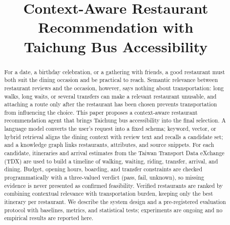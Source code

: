 \documentclass[conference]{IEEEtran}
\begin{document}
\title{Context-Aware Restaurant Recommendation with\\Taichung Bus Accessibility}

\author{
}

\maketitle

\begin{abstract}
For a date, a birthday celebration, or a gathering with friends, a good restaurant must both suit the dining occasion and be practical to reach. Semantic relevance between restaurant reviews and the occasion, however, says nothing about transportation: long walks, long waits, or several transfers can make a relevant restaurant unusable, and attaching a route only after the restaurant has been chosen prevents transportation from influencing the choice. This paper proposes a context-aware restaurant recommendation agent that brings Taichung bus accessibility into the final selection. A language model converts the user's request into a fixed schema; keyword, vector, or hybrid retrieval aligns the dining context with review text and recalls a candidate set; and a knowledge graph links restaurants, attributes, and source snippets. For each candidate, itineraries and arrival estimates from the Taiwan Transport Data eXchange (TDX) are used to build a timeline of walking, waiting, riding, transfer, arrival, and dining. Budget, opening hours, boarding, and transfer constraints are checked programmatically with a three-valued verdict (pass, fail, unknown), so missing evidence is never presented as confirmed feasibility. Verified restaurants are ranked by combining contextual relevance with transportation burden, keeping only the best itinerary per restaurant. We describe the system design and a pre-registered evaluation protocol with baselines, metrics, and statistical tests; experiments are ongoing and no empirical results are reported here.
\end{abstract}
\end{document}
